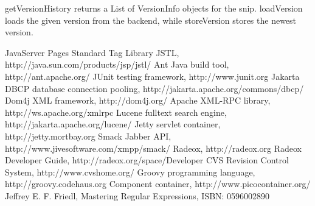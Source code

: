 \documentclass[a4paper,pdftex]{article}
\begin{document}
getVersionHistory returns a List of VersionInfo objects for the snip. loadVersion loads the given
version from the backend, while storeVersion stores the newest version.




\begin{thebibliography}{}
 JavaServer Pages Standard Tag Library JSTL, http://java.sun.com/products/jsp/jstl/
 Ant Java build tool, http://ant.apache.org/
 JUnit testing framework, http://www.junit.org
 Jakarta DBCP database connection pooling, http://jakarta.apache.org/commons/dbcp/
 Dom4j XML framework, http://dom4j.org/
Apache XML-RPC library, http://ws.apache.org/xmlrpc
Lucene fulltext search engine, http://jakarta.apache.org/lucene/
Jetty servlet container, http://jetty.mortbay.org
 Smack Jabber API, http://www.jivesoftware.com/xmpp/smack/
 Radeox,  http://radeox.org
 Radeox Developer Guide, http://radeox.org/space/Developer
 CVS Revision Control System, http://www.cvshome.org/
 Groovy programming language, http://groovy.codehaus.org
 Component container, http://www.picocontainer.org/
 Jeffrey E. F. Friedl, Mastering Regular Expressions, ISBN: 0596002890
\end{thebibliography}
\end{document}
